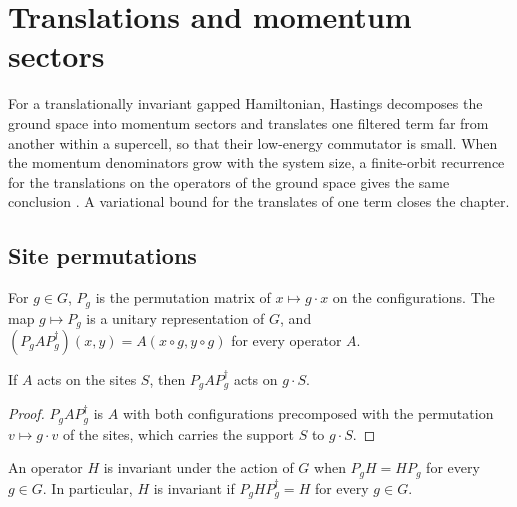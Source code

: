 \chapter{Translations and momentum sectors}
\label{chap:translations}

For a translationally invariant gapped Hamiltonian, Hastings
\cite[lines 1603--1654]{Hastings2006Solving} decomposes the ground space into
momentum sectors and translates one filtered term far from another within a
supercell, so that their low-energy commutator is small. When the momentum
denominators grow with the system size, a finite-orbit recurrence for the
translations on the operators of the ground space gives the same conclusion
\cite{gap:hastings05_translation_supercell}. A variational bound for the
translates of one term closes the chapter.

\section{Site permutations}
\label{sec:translations_site_permutations}

\begin{definition}
    \label{def:hastings_site_permutation}
    \leanok
    For $g\in G$, $P_g$ is the permutation matrix of $x\mapsto g\cdot x$ on the
    configurations. The map $g\mapsto P_g$ is a unitary representation of $G$, and
    $(P_gAP_g^\dagger)(x,y)=A(x\circ g,y\circ g)$ for every operator $A$.
\end{definition}

\begin{lemma}
    \label{thm:hastings_site_permutation_support}
    \leanok
    If $A$ acts on the sites $S$, then $P_gAP_g^\dagger$ acts on $g\cdot S$.
\end{lemma}
\begin{proof}\leanok
    $P_gAP_g^\dagger$ is $A$ with both configurations precomposed with the
    permutation $v\mapsto g\cdot v$ of the sites, which carries the support $S$ to
    $g\cdot S$.
\end{proof}

\begin{definition}
    \label{def:hastings_site_invariant}
    \leanok
    An operator $H$ is invariant under the action of $G$ when $P_gH=HP_g$ for every
    $g\in G$. In particular, $H$ is invariant if $P_gHP_g^\dagger=H$ for every
    $g\in G$.
\end{definition}

